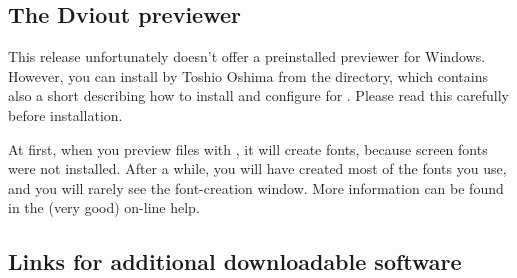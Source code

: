 \documentclass{article}
\begin{document}
\subsection{The Dviout previewer}

This \TL{} release unfortunately doesn't offer a preinstalled \dvi{}
previewer for Windows. However, you can install  by
Toshio Oshima from the  directory, which
contains also a short  describing how to install
and configure  for \TL.  Please read this carefully
before installation.

At first, when you preview files with , it will create fonts,
because screen fonts were not installed. After a while, you will have created
most of the fonts you use, and you will rarely see the font-creation window.
More information can be found in the (very good) on-line help.

\subsection{Links for additional downloadable software}
\end{document}
